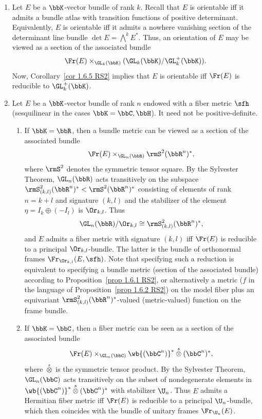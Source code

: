 \begin{example}[{{\cite[Ex.~1.6.6]{RS2}}}]\label{ex 1.6.6 RS2}
    \begin{enumerate}
        \item Let $E$ be a $\bbK$-vector bundle of rank $k$. Recall that $E$ is orientable iff it admits a bundle atlas with transition functions of positive determinant. Equivalently, $E$ is orientable iff it admits a nowhere vanishing section of the determinant line bundle $\det E=\bigwedge^k E^\ast$. Thus, an orientation of $E$ may be viewed as a section of the associated bundle
        \[\Fr(E)\times_{\GL_k(\bbK)}(\GL_k(\bbK)\slash \GL^+_k(\bbK)).\]
        Now, Corollary~\ref{cor 1.6.5 RS2} implies that $E$ is orientable iff $\Fr(E)$ is reducible to $\GL_k^+(\bbK)$.

        \item Let $E$ be a $\bbK$-vector bundle of rank $n$ endowed with a fiber metric $\sfh$ (sesquilinear in the cases $\bbK=\bbC,\bbH$). It need not be positive-definite.
        \begin{enumerate}
            \item If $\bbK=\bbR$, then a bundle metric can be viewed as a section of the associated bundle
            \[\Fr(E)\times_{\GL_n(\bbR)} \rmS^2(\bbR^n)^\ast,\]
            where $\rmS^2$ denotes the symmetric tensor square. By the Sylvester Theorem, $\GL_n(\bbR)$ acts transitively on the subspace $\rmS^2_{(k,l)}(\bbR^n)^\ast< \rmS^2(\bbR^n)^\ast$ consisting of elements of rank $n=k+l$ and signature $(k,l)$ and the stabilizer of the element $\eta=I_k\oplus (-I_l)$ is $\Or_{k,l}$. Thus
            \[\GL_n(\bbR)\slash \Or_{k,l}\cong \rmS^2_{(k,l)}(\bbR^n)^\ast,\]
            and $E$ admits a fiber metric with signature $(k,l)$ iff $\Fr(E)$ is reducible to a principal $\Or_{k,l}$-bundle. The latter is the bundle of orthonormal frames $\Fr_{\Or_{k,l}}(E,\sfh)$. Note that specifying such a reduction is equivalent to specifying a bundle metric (section of the associated bundle) according to Proposition~\ref{prop 1.6.1 RS2}, or alternatively a metric ($f$ in the language of Proposition~\ref{prop 1.6.2 RS2}) on the model fiber plus an equivariant $\rmS^2_{(k,l)}(\bbR^n)^\ast$-valued (metric-valued) function on the frame bundle.

            \item If $\bbK=\bbC$, then a fiber metric can be seen as a section of the associated bundle
            \[\Fr(E)\times_{\GL_n(\bbC)} \wb{(\bbC^n)}^\ast\overset{s}{\otimes} (\bbC^n)^\ast,\]
            where $\overset{s}{\otimes}$ is the symmetric tensor product. By the Sylvester Theorem, $\GL_n(\bbC)$ acts transitively on the subset of nondegenerate elements in $\wb{(\bbC^n)}^\ast\overset{s}{\otimes} (\bbC^n)^\ast$ with stabilizer $\U_n$. Thus $E$ admits a Hermitian fiber metric iff $\Fr(E)$ is reducible to a principal $\U_n$-bundle, which then coincides with the bundle of unitary frames $\Fr_{\U_n}(E)$.
        \end{enumerate}
    \end{enumerate}
\end{example}

